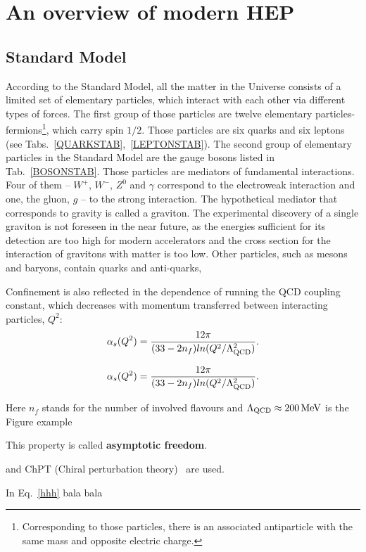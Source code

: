 \FloatBarrier
\newpage
\section{An overview of modern HEP}
\subsection{Standard Model}
\label{SM}
According to the Standard Model, all the matter in the Universe consists of a limited set of elementary particles, which
interact with each other via different types of forces. 
The first group of those particles  are twelve elementary 
particles-fermions\footnote{
Corresponding to those particles, 
there is an associated antiparticle with the same mass 
and opposite electric charge.
}, 
which carry  spin $1/2$.
Those particles are six quarks and six leptons (see Tabs.~\ref{QUARKSTAB},~\ref{LEPTONSTAB}). 
The second group of elementary particles in the Standard 
\CQUARKSTAB
\CLEPTONSTAB
Model are the gauge bosons listed in  Tab.~\ref{BOSONSTAB}. 
Those particles are mediators of fundamental interactions.
Four of them -- $W^{+}$, $W^{-}$, $Z^{0}$ and
 $\gamma$ correspond to the electroweak interaction and one, the gluon, $g$
 -- to the strong interaction.
The hypothetical mediator that corresponds to gravity is called  a graviton.
The experimental discovery of a single graviton is not foreseen in the near future, as the energies
sufficient for its detection are too high for  modern accelerators and the 
cross section for the interaction of gravitons with matter is too low.
\CBOSONSTAB
Other particles, such as mesons and baryons, contain quarks and anti-quarks, 


Confinement is also reflected in the dependence of running the QCD coupling constant, which decreases with  momentum transferred
between interacting particles, $Q^2$:
\begin{equation*}
\alpha_{s}(Q^2)=\frac{12\pi}{(33-2n_f)ln(Q^2/\Lambda^2_{\rm{QCD}})}.
\end{equation*}

\begin{equation}
\alpha_{s}(Q^2)=\frac{12\pi}{(33-2n_f)ln(Q^2/\Lambda^2_{\rm{QCD}})}.
\label{hhh}
\end{equation}


Here $n_f$ stands for the number of involved flavours and $\Lambda_{\rm{QCD}}\approx200{\,\text{Me}\kern-0.06667em\text{V\/}}$ is the
Figure example
\FHERAONE


 This property is called \textbf{asymptotic freedom}.

 and ChPT (Chiral perturbation theory)~\cite{Wise:1992hn} are used.



In Eq.~\ref{hhh} bala bala
